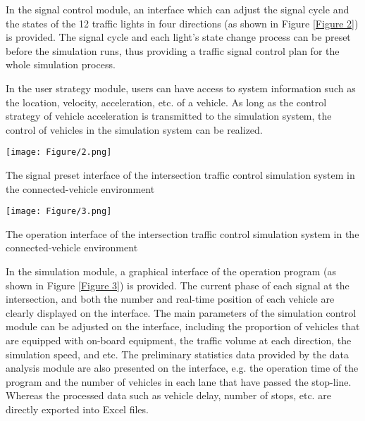 \documentclass[10.5pt,compsoc]{TsT}
\theoremstyle{mystyle}
\begin{document}
{In the signal control module, an interface which can adjust the signal
cycle and the states of the 12 traffic lights in four directions (as
shown in Figure \ref{Figure 2}) is provided. The signal cycle and each light's state
change process can be preset before the simulation runs, thus providing
a traffic signal control plan for the whole simulation process.

In the user strategy module, users can have access to system information
such as the location, velocity, acceleration, etc. of a vehicle. As long
as the control strategy of vehicle acceleration is transmitted to the
simulation system, the control of vehicles in the simulation system can
be realized.

\begin{strip}
\centering
\begin{figurehere}
\centering
\texttt{[image: Figure/2.png]}
\caption{The signal preset interface of the intersection traffic control
simulation system in the connected-vehicle environment}
\label{Figure 2}
\end{figurehere}
\vspace{2em}
\begin{figurehere}
\centering
\texttt{[image: Figure/3.png]}
\caption{The operation interface of the intersection traffic control
simulation system in the connected-vehicle environment}
\label{Figure 3}
\end{figurehere}
\end{strip}
\noindent
In the simulation module, a graphical interface of the operation program
(as shown in Figure \ref{Figure 3}) is provided. The current phase of each signal at
the intersection, and both the number and real-time position of each
vehicle are clearly displayed on the interface. The main parameters of
the simulation control module can be adjusted on the interface,
including the proportion of vehicles that are equipped with on-board
equipment, the traffic volume at each direction, the simulation speed,
and etc. The preliminary statistics data provided by the data analysis
module are also presented on the interface, e.g. the operation time of
the program and the number of vehicles in each lane that have passed the
stop-line. Whereas the processed data such as vehicle delay, number of
stops, etc. are directly exported into Excel files.

}
\end{document}
